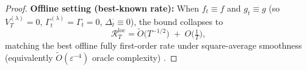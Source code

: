 \documentclass{uai2026} %
\newcommand{\EE}{\mathbb{E}}
\begin{document}
\begin{proof}
\textbf{Offline setting (best-known rate):}
When $f_t\equiv f$ and $g_t\equiv g$ (so $V_T^{(\lambda)}=0$, $\Gamma_t^{(\lambda)}=\Gamma_t=0$, $\Delta^\cdot_t\equiv 0$), the bound collapses to
$$
\mathcal{R}^{\mathrm{loc}}_T
=\tilde O\!\Big(T^{-1/2}\Big)\;+\;O\!\Big(\tfrac{1}{T}\Big),
$$
matching the best offline fully first-order rate under square-average smoothness (equivalently $\tilde O(\varepsilon^{-4})$ oracle complexity)  \citep{kwon2023fully}.




\end{proof}
\end{document}
